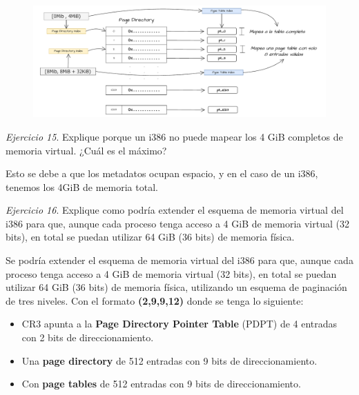 \documentclass[12pt]{article}
\begin{document}
\begin{figure}[h]
    \centering
    \includegraphics[width=1\textwidth]{ej143.pdf}
\end{figure}

\newpage
\noindent \textit{Ejercicio 15}.  Explique porque un i386 no puede mapear los 4 GiB completos de memoria virtual. ¿Cuál es el máximo?

\begin{rta}
    Esto se debe a que los metadatos ocupan espacio, y en el caso de un i386, tenemos los 4GiB de memoria total.
\end{rta}

\noindent \textit{Ejercicio 16}. Explique como podría extender el esquema de memoria virtual del i386 para que, aunque cada proceso tenga acceso a 4 GiB de memoria virtual (32 bits), en total se puedan utilizar 64 GiB (36 bits) de memoria física.

\begin{rta}
    Se podría extender el esquema de memoria virtual del i386 para que, aunque cada proceso tenga acceso a 4 GiB de memoria virtual (32 bits), en total se puedan utilizar 64 GiB (36 bits) de memoria física, utilizando un esquema de paginación de tres niveles. Con el formato \textbf{(2,9,9,12)} donde se tenga lo siguiente:
    \begin{itemize}
        \item CR3 apunta a la \textbf{Page Directory Pointer Table} (PDPT) de 4 entradas con 2 bits de direccionamiento.
        \item Una \textbf{page directory} de 512 entradas con 9 bits de direccionamiento.
        \item Con \textbf{page tables} de 512 entradas con 9 bits de direccionamiento.
    \end{itemize} 
\end{rta}
\end{document}
